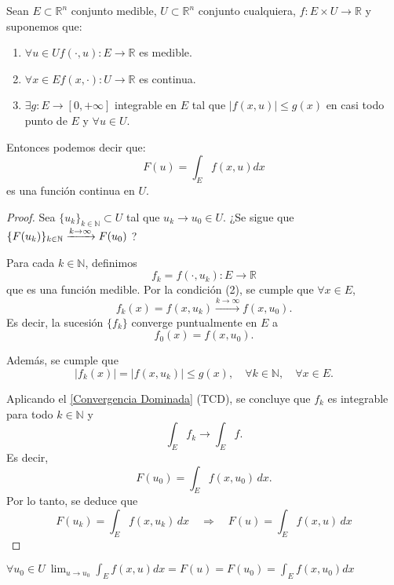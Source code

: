 \begin{teorema}
    Sean $E \subset \mathbb{R}^n$ conjunto medible, $U \subset \mathbb{R}^n$ conjunto cualquiera, $f: E \times U \to \mathbb{R}$ y suponemos que:
    \vspace{-0.5em}
    \begin{enumerate}
        \item $\forall u \in U f(\cdot, u): E \to \mathbb{R}$ es medible.
        \item $\forall x \in E f(x, \cdot): U \to \mathbb{R}$ es continua.
        \item $\exists g: E \to [0, +\infty]$ integrable en $E$ tal que $|f(x, u)| \leq g(x)$ en casi todo punto de $E$ y $\forall u \in U$.
    \end{enumerate}
    Entonces podemos decir que:
    $$ F(u) = \int_{E}f(x, u)dx $$ es una función continua en $U$.
\end{teorema}
\begin{proof}
    Sea \( \{ u_k \}_{k \in \mathbb{N}} \subset U \) tal que \( u_k \to u_0 \in U \).
    ¿Se sigue que \( \{ F(u_k) \}_{k \in \mathbb{N}} \xrightarrow{k \to \infty} F(u_0) \) ?

    Para cada \( k \in \mathbb{N} \), definimos
    \[
        f_k = f(\cdot, u_k): E \to \mathbb{R}
    \]
    que es una función medible. Por la condición (2), se cumple que \( \forall x
    \in E \),
    \[
        f_k(x) = f(x, u_k) \xrightarrow{k \to \infty} f(x, u_0).
    \]
    Es decir, la sucesión \( \{ f_k \} \) converge puntualmente en \( E \) a
    \[
        f_0(x) = f(x, u_0).
    \]

    Además, se cumple que
    \[
        |f_k(x)| = |f(x, u_k)| \leq g(x), \quad \forall k \in \mathbb{N}, \quad \forall x \in E.
    \]

    Aplicando el \cref{Convergencia Dominada} (TCD), se concluye que \( f_k \)
    es integrable para todo \( k \in \mathbb{N} \) y
    \[
        \int_E f_k \to \int_E f.
    \]
    Es decir,
    \[
        F(u_0) = \int_E f(x, u_0) \,dx.
    \]
    Por lo tanto, se deduce que
    \[
        F(u_k) = \int_E f(x, u_k) \,dx \quad \Rightarrow \quad F(u) = \int_E f(x, u) \,dx
    \]
\end{proof}
\begin{observación}
$\forall u_0 \in U \ \lim_{u \to u_0} \int_{E}f(x, u)dx = F(u) = F(u_0) = \int_{E}f(x, u_0)dx$
\end{observación}
